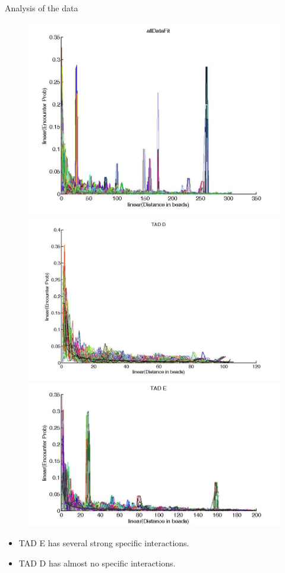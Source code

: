 \documentclass[8pt]{beamer}
\begin{document}
\begin{frame}{Analysis of the data}
\begin{figure}[H]\label{TADDAndEencounterProb}
\includegraphics[scale=0.1]{encounterProbabilityTADDAndE}
\includegraphics[scale=0.1]{encounterProbabilityTADD}
\includegraphics[scale=0.13]{encounterProbabilityTADE}
\end{figure}
\begin{itemize}
\item TAD E has several strong specific interactions.
\item TAD D has almost no specific interactions. 
\end{itemize}
\end{frame}
\end{document}
